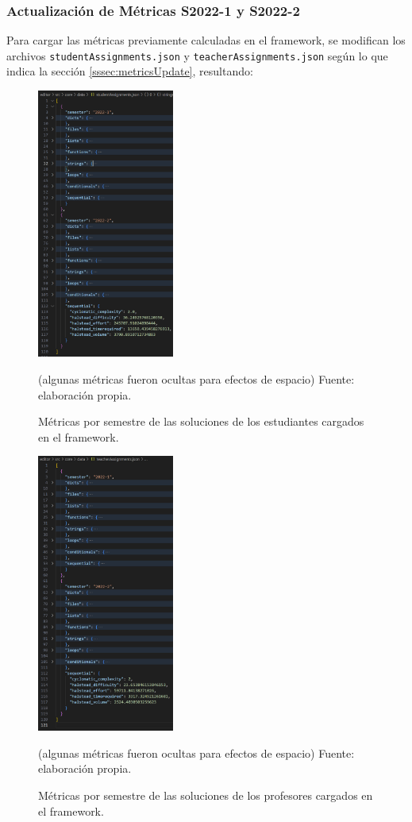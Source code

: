 \documentclass[letterpaper,12pt]{article}
\begin{document}
\subsubsection{Actualización de Métricas S2022-1 y S2022-2}
Para cargar las métricas previamente calculadas en el framework, se modifican los archivos \texttt{studentAssignments.json} y \texttt{teacherAssignments.json} según lo que indica la sección \ref{sssec:metricsUpdate}, resultando:
\begin{figure}[H]
  \centering
  \includegraphics[width=0.4\textwidth]{figures/studentsMetrics1.png}
  \caption{Métricas por semestre de las soluciones de los estudiantes cargados en el framework.} (algunas métricas fueron ocultas para efectos de espacio) Fuente: elaboración propia.
  \label{img:studentsMetrics1}
\end{figure}
\begin{figure}[H]
  \centering
  \includegraphics[width=0.4\textwidth]{figures/teacherMetrics1.png}
  \caption{Métricas por semestre de las soluciones de los profesores cargados en el framework.} (algunas métricas fueron ocultas para efectos de espacio) Fuente: elaboración propia.
  \label{img:teacherMetrics1}
\end{figure}
\end{document}
